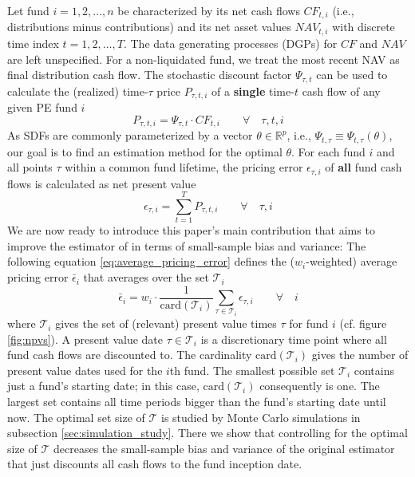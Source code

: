 \documentclass[12pt]{article}
\begin{document}
Let fund $i=1,2,\dots,n$ be characterized by its net cash flows ${CF}_{t,i}$ (i.e., distributions minus contributions) and its net asset values ${NAV}_{t,i}$ with discrete time index $t=1,2,\dots,T$.
The data generating processes (DGPs) for $CF$ and $NAV$ are left unspecified.
For a non-liquidated fund, we treat the most recent NAV as final distribution cash flow.
The stochastic discount factor $\Psi_{\tau,t}$ can be used to calculate the (realized) time-$\tau$ price $P_{\tau,t,i}$ of a \textbf{single} time-$t$ cash flow of any given PE fund $i$
\begin{equation}
\label{eq:price}
P_{\tau,t,i} = \Psi_{\tau,t} \cdot CF_{t,i}
\qquad \forall \quad \tau,t,i
\end{equation}
As SDFs are commonly parameterized by a vector $\theta \in \mathbb{R}^{p}$, i.e., $\Psi_{t,\tau} \equiv \Psi_{t,\tau} (\theta)$, our goal is to find an estimation method for the optimal $\theta$.
For each fund $i$ and all points $\tau$ within a common fund lifetime, the pricing error $\epsilon_{\tau,i}$ of \textbf{all} fund cash flows is calculated as net present value
\begin{equation}
\label{eq:pricing_error}
\epsilon_{\tau,i} = \sum_{t=1}^T P_{\tau,t,i} 
\qquad \forall \quad \tau,i
\end{equation}
We are now ready to introduce this paper's main contribution that aims to improve the estimator of \cite{DLP12} in terms of small-sample bias and variance:
The following equation \ref{eq:average_pricing_error} defines the ($w_i$-weighted) average pricing error $\bar{\epsilon}_{i}$ that averages over the set $\mathcal{T}_i$
\begin{equation}
\label{eq:average_pricing_error}
\bar{\epsilon}_{i} =
w_{i} \cdot
\frac{1}{ \mathrm{card}(\mathcal{T}_{i}) }
\sum_{\tau \in \mathcal{T}_{i}}
\epsilon_{\tau,i}
\qquad \forall \quad i
\end{equation}
where $\mathcal{T}_i$ gives the set of (relevant) present value times $\tau$ for fund $i$ (cf. figure \ref{fig:npvs}).
A present value date $\tau \in \mathcal{T}_{i}$ is a discretionary time point where all fund cash flows are discounted to.
The cardinality $\mathrm{card}(\mathcal{T}_{i})$ gives the number of present value dates used for the $i$th fund.
The smallest possible set $\mathcal{T}_i$ contains just a fund's starting date; in this case, $\mathrm{card}(\mathcal{T}_{i})$ consequently is one.
The largest set contains all time periods bigger than the fund's starting date until now.
The optimal set size of $\mathcal{T}$ is studied by Monte Carlo simulations in subsection \ref{sec:simulation_study}.
There we show that controlling for the optimal size of $\mathcal{T}$ decreases the small-sample bias and variance of the original \cite{DLP12} estimator that just discounts all cash flows to the fund inception date.
\end{document}
